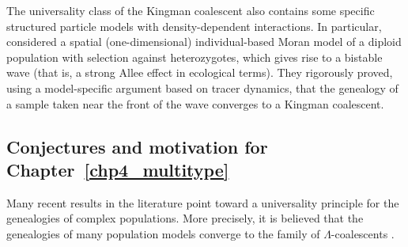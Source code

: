 The universality class of the Kingman coalescent also contains some specific structured particle models with density-dependent interactions. In particular,~\cite{etheridge_genealogies_2022} considered a spatial (one-dimensional) individual-based Moran model of a diploid population with selection against heterozygotes, which gives rise to a bistable wave (that is, a strong Allee effect in ecological terms). They rigorously proved, using a model-specific argument based on tracer dynamics, that the genealogy of a sample taken near the front of the wave converges to a Kingman coalescent.

\subsection{Conjectures and motivation for Chapter~\ref{chp4_multitype}}

Many recent results in the literature point toward a universality principle for the genealogies of complex populations.
More precisely, it is believed that the genealogies of many
population models converge to the family of $\Lambda$-coalescents \citep{Pitman:1999aa,sagitov1999general}. 

